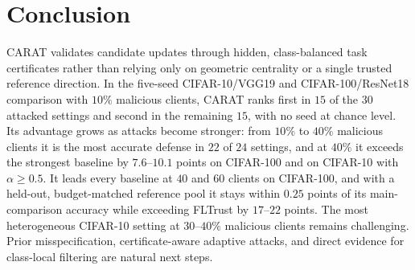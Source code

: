 \section{Conclusion}
\label{sec:conclusion}

CARAT validates candidate updates through hidden, class-balanced task certificates rather than relying only on geometric centrality or a single trusted reference direction. In the five-seed CIFAR-10/VGG19 and CIFAR-100/ResNet18 comparison with $10\%$ malicious clients, CARAT ranks first in $15$ of the $30$ attacked settings and second in the remaining $15$, with no seed at chance level. Its advantage grows as attacks become stronger: from $10\%$ to $40\%$ malicious clients it is the most accurate defense in $22$ of $24$ settings, and at $40\%$ it exceeds the strongest baseline by $7.6$--$10.1$ points on CIFAR-100 and on CIFAR-10 with $\alpha\ge0.5$. It leads every baseline at $40$ and $60$ clients on CIFAR-100, and with a held-out, budget-matched reference pool it stays within $0.25$ points of its main-comparison accuracy while exceeding FLTrust by $17$--$22$ points. The most heterogeneous CIFAR-10 setting at $30$--$40\%$ malicious clients remains challenging. Prior misspecification, certificate-aware adaptive attacks, and direct evidence for class-local filtering are natural next steps.
